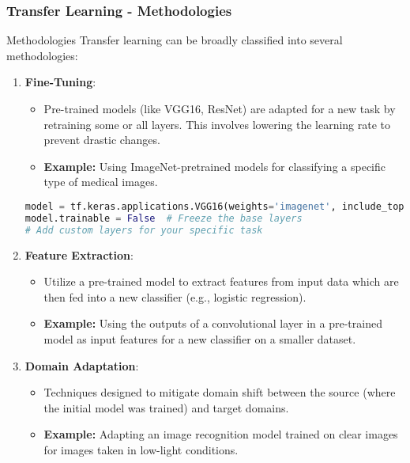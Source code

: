 \documentclass[aspectratio=169]{beamer}
\begin{document}
\begin{frame}[fragile]
    \frametitle{Transfer Learning - Methodologies}
    \begin{block}{Methodologies}
        Transfer learning can be broadly classified into several methodologies:
        \begin{enumerate}
            \item \textbf{Fine-Tuning}:
                \begin{itemize}
                    \item Pre-trained models (like VGG16, ResNet) are adapted for a new task by retraining some or all layers. This involves lowering the learning rate to prevent drastic changes.
                    \item \textbf{Example:} Using ImageNet-pretrained models for classifying a specific type of medical images.
                \end{itemize}
                \begin{lstlisting}[language=Python]
model = tf.keras.applications.VGG16(weights='imagenet', include_top=False)
model.trainable = False  # Freeze the base layers
# Add custom layers for your specific task
                \end{lstlisting}
                
            \item \textbf{Feature Extraction}:
                \begin{itemize}
                    \item Utilize a pre-trained model to extract features from input data which are then fed into a new classifier (e.g., logistic regression).
                    \item \textbf{Example:} Using the outputs of a convolutional layer in a pre-trained model as input features for a new classifier on a smaller dataset.
                \end{itemize}
                
            \item \textbf{Domain Adaptation}:
                \begin{itemize}
                    \item Techniques designed to mitigate domain shift between the source (where the initial model was trained) and target domains.
                    \item \textbf{Example:} Adapting an image recognition model trained on clear images for images taken in low-light conditions.
                \end{itemize}
        \end{enumerate}
    \end{block}
\end{frame}
\end{document}
